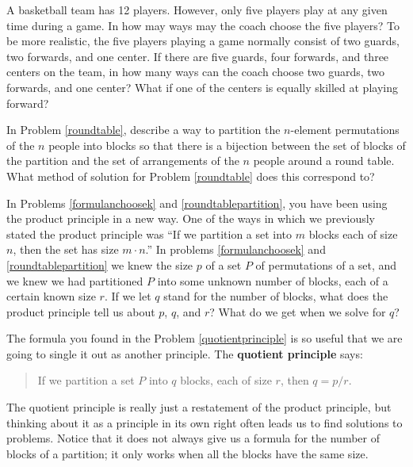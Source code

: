 \itemi A basketball team has 12 players.  However, only five players play at
any given time during a game.  In how may ways may the coach choose the five
players?  To be more realistic, the five players playing a game normally
consist of two guards, two forwards, and one center.  If there are five
guards, four forwards, and three centers on the team, in how many ways can the
coach choose two guards, two forwards, and one center?  What if one of the
centers is equally skilled at playing forward?



\iteme In Problem \ref{roundtable}, describe a way to partition the
$n$-element permutations of the $n$ people into blocks so that there is a
bijection between the set of blocks of the partition and the set of
arrangements of the
$n$ people around a round table.  What method of solution for Problem
\ref{roundtable} does this correspond to? \label{roundtablepartition}

\iteme In Problems \ref{formulanchoosek} and \ref{roundtablepartition}, you
have been using the product principle in a new way.  One of the ways in which
we previously stated the product principle was ``If we partition a set into
$m$ blocks each of size $n$, then the set has size $m\cdot n$.''  In problems
\ref{formulanchoosek} and \ref{roundtablepartition} we knew the size $p$ of a
set
$P$ of permutations of a set, and we knew we had partitioned $P$ into some
unknown number of blocks, each of a certain known size $r$.  If we let
$q$ stand for the number of blocks, what does the product principle tell us
about $p$, $q$, and
$r$?  What do we get when we solve for $q$?\label{quotientprinciple}
\ep

The formula you found in the Problem \ref{quotientprinciple} is so useful that
we are going to single it out as another principle.  The {\bf quotient
principle} says: 
\begin{quote}If we partition a set $P$ 
into $q$ blocks, each of size $r$, then $q=p/r.$
\end{quote}
The quotient principle is really just a restatement of the product principle,
but thinking about it as a principle in its own right often leads us to find
solutions to problems.  Notice that it does not always give us a formula for
the number of blocks of a partition; it only works when all the blocks have
the same size.


